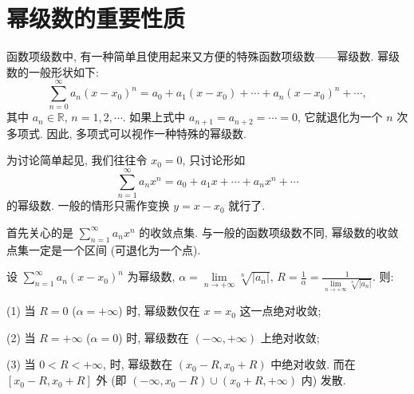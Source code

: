 \section{幂级数的重要性质}\label{sec:14.1}

函数项级数中, 有一种简单且使用起来又方便的特殊函数项级数——幂级数. 幂级数的一般形状如下:
\[
  \sum_{n=0}^{\infty}a_{n}(x-x_{0})^{n}=a_{0}+a_{1}(x-x_{0})+\cdots+a_{n}(x-x_{0})^{n}+\cdots,
\]
其中 $a_{n}\in\mathbb{R}$, $n=1,2,\cdots$. 如果上式中 $a_{n+1}=a_{n+2}=\cdots=0$, 它就退化为一个 $n$ 次多项式. 因此, 多项式可以视作一种特殊的幂级数.

为讨论简单起见, 我们往往令 $x_{0}=0$, 只讨论形如
\[
  \sum_{n=1}^{\infty}a_{n}x^{n}=a_{0}+a_{1}x+\cdots+a_{n}x^{n}+\cdots
\]
的幂级数. 一般的情形只需作变换 $y=x-x_{0}$ 就行了.

首先关心的是 $\sum_{n=1}^{\infty}a_{n}x^{n}$ 的收敛点集. 与一般的函数项级数不同, 幂级数的收敛点集一定是一个区间 (可退化为一个点).

\begin{theorem}\label{thm:14.1.1}
设 $\sum_{n=1}^{\infty}a_{n}(x-x_{0})^{n}$ 为幂级数, $\alpha=\lim\limits_{n\to+\infty}\sqrt[n]{|a_{n}|}$, $R=\frac{1}{\alpha}=\frac{1}{\lim\limits_{n\to+\infty}\sqrt[n]{|a_{n}|}}$. 则:

(1) 当 $R=0$ ($\alpha=+\infty$) 时, 幂级数仅在 $x=x_{0}$ 这一点绝对收敛;

(2) 当 $R=+\infty$ ($\alpha=0$) 时, 幂级数在 $(-\infty,+\infty)$ 上绝对收敛;

(3) 当 $0<R<+\infty$, 时, 幂级数在 $(x_{0}-R,x_{0}+R)$ 中绝对收敛. 而在 $[x_{0}-R,x_{0}+R]$ 外 (即 $(-\infty,x_{0}-R)\cup(x_{0}+R,+\infty)$ 内) 发散.
\end{theorem}

